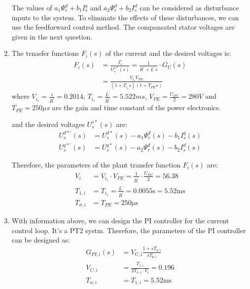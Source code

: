 \documentclass[12pt,a4paper, openany]{book}
\begin{document}
\begin{enumerate}
 The values of $a_1\Psi_r^d+b_1I_s^q$ and $a_2\Psi_r^d+b_2I_s^d$ can be considered as disturbance inputs to the system. To eliminate the effects of these disturbances, we can use the feedforward control method. The compansated stator voltages are given in the next question.

\item 
The trnasfer functions $F_{i}(s)$ of the current and the desired voltages is:
\begin{equation}
    \begin{aligned}
    F_{i}(s)&=\frac{I_s^s}{U_s^{s*}(s)}=\frac{1}{R^{\prime}+L^{\prime}s}\cdot G_U(s)\\
        &=\frac{V_{i_s}V_{PE}}{(1+T_{i_s}s)\left(1+T_{PE}s\right)}
    \end{aligned}
\end{equation}
where $V_{i_s}=\frac{1}{R^{\prime}}=0.2014$, $T_{i_s}=\frac{L^{\prime}}{R^{\prime}}=5.522ms$, $V_{PE}=\frac{U_{DC}}{2}=280V$ and $T_{PE}=250\mu s$ are the gain and time constant of the power electronics.

and the desired voltages $U_s^{s*}(s)$ are:
\begin{equation}
    \begin{aligned}
        U_s^{d*\prime}(s)&=U_s^{d*}(s)-a_1\Psi_r^d(s)-b_1I_s^q(s)\\
        U_s^{q*\prime }(s)&=U_s^{q*}(s)-a_2\Psi_r^d(s)-b_2I_s^d(s)
    \end{aligned}
\end{equation}

Therefore, the parameters of the plant transfer function $F_{i}(s)$ are:
\begin{equation}
    \begin{aligned}
V_{i} & =V_{i_{s}}\cdot V_{PE}=\frac{1}{R^{\prime}}\cdot\frac{U_{DC}}{2}=56.38 \\
T_{1,i} & =T_{i_{s}}=\frac{L^{\prime}}{R^{\prime}}=0.0055\mathrm{s}=5.52\mathrm{ms} \\
T_{\sigma,i} & =T_{PE}=250\mathrm{\mu s}
\end{aligned}
\end{equation}

\item 
With information above, we can design the PI controller for the current control loop. It's a PT2 systm. Therefore, the parameters of the PI controller can be designed as:
\begin{equation}
    \begin{aligned}
        G_{PI,i}(s)&=V_{\mathrm{C,i}}\frac{1+sT_{\mathrm{n,i}}}{sT_{\mathrm{n,i}}}\\
        V_{C,i}&=\frac{T_{1,i}}{2T_{\sigma,i}\cdot V_i}=0.196\\
        T_{n,i}&=T_{1,i}=5.52\mathrm{ms}
    \end{aligned}
\end{equation}
\end{enumerate}
\end{document}
